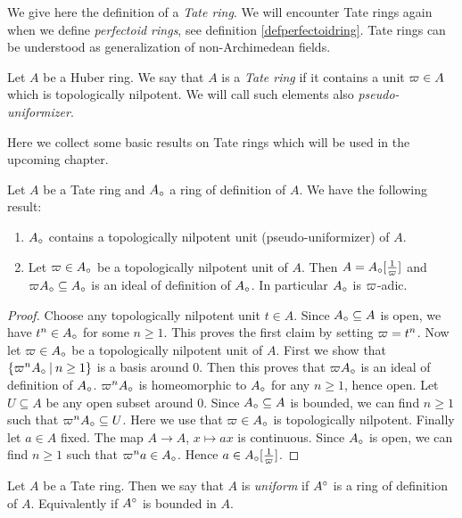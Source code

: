 We give here the definition of a \emph{Tate ring}. We will encounter Tate rings again when we define \emph{perfectoid rings}, see definition \ref{defperfectoidring}. Tate rings can be understood as generalization of non-Archimedean fields.

\begin{definition}
Let $A$ be a Huber ring.
We say that $A$ is a \emph{Tate ring} if it contains a unit $\varpi\in A$ which is topologically nilpotent. We will call such elements also \emph{pseudo-uniformizer}.
\end{definition}


Here we collect some basic results on Tate rings which will be used in the upcoming chapter.

\begin{prop}\label{proptatering1}
Let $A$ be a Tate ring and $A{_{\circ}}$ a ring of definition of $A$. We have the following result:
\begin{enumerate}
\item $A{_{\circ}}$ contains a topologically nilpotent unit (pseudo-uniformizer) of $A$.
\item Let $\varpi\in A{_{\circ}}$  be a topologically nilpotent unit of $A$. Then $A=A{_{\circ}}[\frac{1}{\varpi}]$ and $\varpi A{_{\circ}}\subseteq A{_{\circ}}$ is an ideal of definition of $A{_{\circ}}$. In particular $A{_{\circ}}$ is $\varpi$-adic.
\end{enumerate}
\end{prop}
\begin{proof}
Choose any topologically nilpotent unit $t\in A$. Since $A{_{\circ}}\subseteq A$ is open, we have $t^n\in A{_{\circ}}$ for some $n\geq 1$. This proves the first claim by setting $\varpi = t^n$.
Now let $\varpi\in A{_{\circ}}$  be a topologically nilpotent unit of $A$. First we show that $\{\varpi^n A{_{\circ}}\:\vert\: n\geq 1\}$ is a basis around 0. Then this proves that $\varpi A{_{\circ}}$ is an ideal of definition of $A{_{\circ}}$. 
$\varpi^n A{_{\circ}}$ is homeomorphic to $A{_{\circ}}$ for any $n\geq 1$, hence open. Let $U\subseteq A$ be any open subset around 0. Since $A{_{\circ}}\subseteq A$ is bounded, we can find $n\geq1$ such that $\varpi^n A{_{\circ}}\subseteq U$. Here we use that $\varpi\in A{_{\circ}}$ is topologically nilpotent.
Finally let $a\in A$ fixed. The map $A\to A$, $ x\mapsto ax$ is continuous. Since $A{_{\circ}}$ is open, we can find $n\geq 1$ such that $\varpi^na\in A{_{\circ}}$. Hence $a\in A{_{\circ}}[\frac{1}{\varpi}]$.
\end{proof}


\begin{definition}
Let $A$ be a  Tate ring. Then we say that $A$ is \emph{uniform} if $A{^{\circ}}$ is a ring of definition of $A$. Equivalently if $A{^{\circ}}$ is bounded in $A$.
\end{definition}

